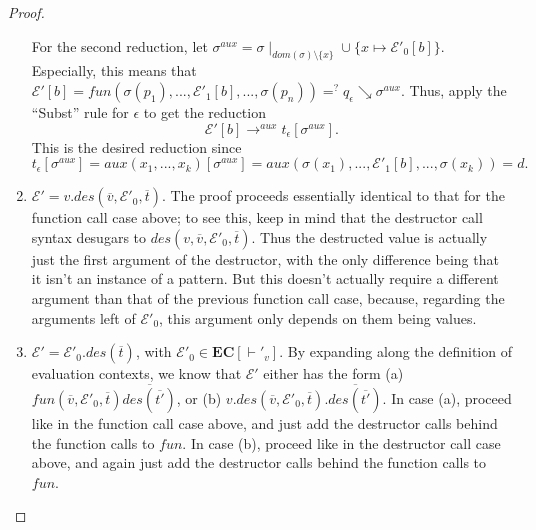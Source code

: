 \begin{lemma}
\begin{proof}
\begin{enumerate}
\begin{prooftree}
\end{prooftree}

For the second reduction, let $\sigma^{aux} = \sigma \mid_{dom(\sigma) \setminus \{x\}} \cup \{x \mapsto \mathcal{E}'_0[b]\}$. Especially, this means that $\mathcal{E}'[b] = fun(\sigma(p_1), ..., \mathcal{E}'_1[b], ..., \sigma(p_n)) =^? q_\epsilon \searrow \sigma^{aux}$. Thus, apply the ``Subst'' rule for $\epsilon$ to get the reduction
\[
\mathcal{E}'[b] \longrightarrow^{aux} t_\epsilon[\sigma^{aux}].
\]
This is the desired reduction since
\[
t_\epsilon[\sigma^{aux}] = aux(x_1, ..., x_k)[\sigma^{aux}] = aux(\sigma(x_1), ..., \mathcal{E}'_1[b], ..., \sigma(x_k)) = d.
\]

\item $\mathcal{E}' = v.des(\overline{v}, \mathcal{E}'_0, \overline{t})$. The proof proceeds essentially identical to that for the function call case above; to see this, keep in mind that the destructor call syntax desugars to $des(v, \overline{v}, \mathcal{E}'_0, \overline{t})$. Thus the destructed value is actually just the first argument of the destructor, with the only difference being that it isn't an instance of a pattern. But this doesn't actually require a different argument than that of the previous function call case, because, regarding the arguments left of $\mathcal{E}'_0$, this argument only depends on them being values.

\item $\mathcal{E}' = \mathcal{E}'_0.des(\overline{t})$, with $\mathcal{E}'_0 \in \mathbf{EC}[\vdash'_v]$. By expanding along the definition of evaluation contexts, we know that $\mathcal{E}'$ either has the form (a) $fun(\overline{v}, \mathcal{E}'_0, \overline{t})\overline{des(\overline{t'})}$, or (b) $v.des(\overline{v}, \mathcal{E}'_0, \overline{t}).\overline{des(\overline{t'})}$. In case (a), proceed like in the function call case above, and just add the destructor calls behind the function calls to $fun$. In case (b), proceed like in the destructor call case above, and again just add the destructor calls behind the function calls to $fun$.
\end{enumerate}
\end{proof}
\end{lemma}

